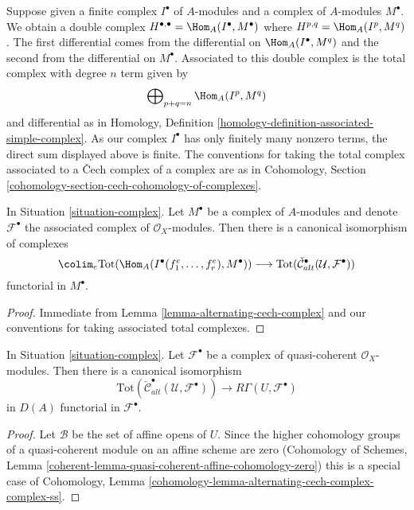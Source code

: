 \noindent
Suppose given a finite complex $I^\bullet$ of $A$-modules and a
complex of $A$-modules $M^\bullet$. We obtain a double complex
$H^{\bullet, \bullet} = \Hom_A(I^\bullet, M^\bullet)$ where
$H^{p, q} = \Hom_A(I^p, M^q)$. The first differential comes from
the differential on $\Hom_A(I^\bullet, M^q)$ and the second
from the differential on $M^\bullet$. Associated to this double
complex is the total complex with degree $n$ term given by
$$
\bigoplus\nolimits_{p + q = n} \Hom_A(I^p, M^q)
$$
and differential as in
Homology, Definition \ref{homology-definition-associated-simple-complex}.
As our complex $I^\bullet$ has only finitely many nonzero terms, the
direct sum displayed above is finite.
The conventions for taking the total complex associated to a
{\v C}ech complex of a complex are as in
Cohomology, Section \ref{cohomology-section-cech-cohomology-of-complexes}.

\begin{lemma}
\label{lemma-alternating-cech-complex-complex}
In Situation \ref{situation-complex}. Let $M^\bullet$ be a
complex of $A$-modules and
denote $\mathcal{F}^\bullet$ the associated complex of
$\mathcal{O}_X$-modules. Then
there is a canonical isomorphism of complexes
$$
\colim_e \text{Tot}(\Hom_A(I^\bullet(f_1^e, \ldots, f_r^e), M^\bullet))
\longrightarrow
\text{Tot}(\check{\mathcal{C}}_{alt}^\bullet(\mathcal{U}, \mathcal{F}^\bullet))
$$
functorial in $M^\bullet$.
\end{lemma}

\begin{proof}
Immediate from Lemma \ref{lemma-alternating-cech-complex}
and our conventions for taking associated total complexes.
\end{proof}

\begin{lemma}
\label{lemma-alternating-cech-complex-complex-computes-cohomology}
In Situation \ref{situation-complex}. Let $\mathcal{F}^\bullet$
be a complex of quasi-coherent $\mathcal{O}_X$-modules. Then
there is a canonical isomorphism
$$
\text{Tot}(\check{\mathcal{C}}_{alt}^\bullet(\mathcal{U}, \mathcal{F}^\bullet))
\longrightarrow
R\Gamma(U, \mathcal{F}^\bullet)
$$
in $D(A)$ functorial in $\mathcal{F}^\bullet$.
\end{lemma}

\begin{proof}
Let $\mathcal{B}$ be the set of affine opens of $U$. Since the higher
cohomology groups of a quasi-coherent module on an affine scheme are zero
(Cohomology of Schemes, Lemma
\ref{coherent-lemma-quasi-coherent-affine-cohomology-zero})
this is a special case of
Cohomology, Lemma \ref{cohomology-lemma-alternating-cech-complex-complex-ss}.
\end{proof}

